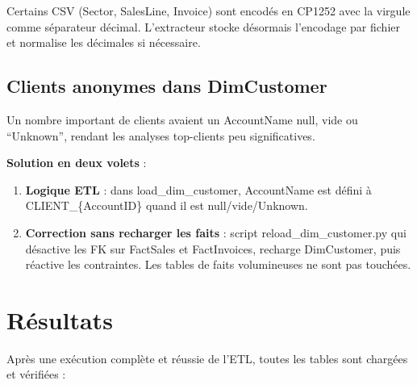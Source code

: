 \documentclass[11pt,a4paper]{article}
\renewcommand{\texttt}[1]{{\ttfamily\small\colorbox{codebg}{\textcolor{darktext}{#1}}}}
\begin{document}
Certains CSV (Sector, SalesLine, Invoice) sont encodés en CP1252 avec la virgule comme séparateur décimal. L'extracteur stocke désormais l'encodage par fichier et normalise les décimales si nécessaire.

\subsection{Clients anonymes dans DimCustomer}

\begin{warnbox}
Un nombre important de clients avaient un \texttt{AccountName} null, vide ou ``Unknown'', rendant les analyses top-clients peu significatives.
\end{warnbox}

\textbf{Solution en deux volets} :
\begin{enumerate}[noitemsep,leftmargin=1.2em]
  \item \textbf{Logique ETL} : dans \texttt{load\_dim\_customer}, \texttt{AccountName} est défini à \texttt{CLIENT\_\{AccountID\}} quand il est null/vide/Unknown.
  \item \textbf{Correction sans recharger les faits} : script \texttt{reload\_dim\_customer.py} qui désactive les FK sur FactSales et FactInvoices, recharge DimCustomer, puis réactive les contraintes. Les tables de faits volumineuses ne sont pas touchées.
\end{enumerate}

\section{Résultats}

\begin{successbox}
Après une exécution complète et réussie de l'ETL, toutes les tables sont chargées et vérifiées :
\end{successbox}
\end{document}
